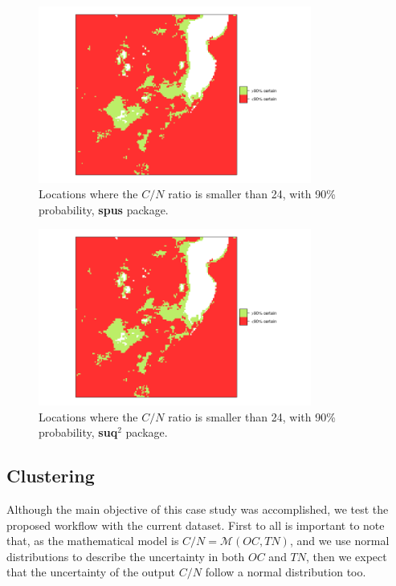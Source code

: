 \begin{figure}[H]
    \centering
    \includegraphics[width=0.8\textwidth]{img/use_cases/spus/respuesta_spus2.png}
    \caption{Locations where the $C/N$ ratio is smaller than 24, with 90\% probability, \textbf{spus} package.}
    \label{fig:resp_spus}
\end{figure}

\begin{figure}[H]
    \centering
    \includegraphics[width=0.8\textwidth]{img/use_cases/spus/respuesta_suq22.png}
    \caption{Locations where the $C/N$ ratio is smaller than 24, with 90\% probability, \textbf{suq$^2$} package.}
    \label{fig:resp_suq2}
\end{figure}

\subsection{Clustering}
Although the main objective of this case study was accomplished, we test the proposed workflow with the current dataset. First to all is important to note that, as the mathematical model is $C/N = \mathcal{M}(OC, TN)$, and we use normal distributions to describe the uncertainty in both $OC$ and $TN$, then we expect that the uncertainty of the output $C/N$ follow a normal distribution too.


